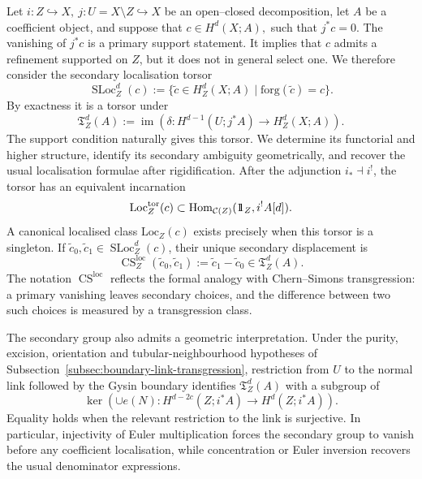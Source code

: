 \documentclass[10pt,a4paper,dvipsnames,x11names]{amsart}
\newcommand{\one}{1\hskip-3.5pt1}
\newcommand{\C}{\mathcal C}
\newcommand{\Hom}{\mathrm{Hom}}
\newcommand{\forg}{\mathrm{forg}}
\newcommand{\Loc}{\mathrm{Loc}}
\newcommand{\SLoc}{\operatorname{SLoc}}
\newcommand{\TLoc}{\mathfrak T}
\newcommand{\CSLoc}{\operatorname{CS}^{\mathrm{loc}}}
\numberwithin{equation}{section}
\theoremstyle{plain}
\theoremstyle{definition}
\theoremstyle{remark}
\begin{document}
Let
$
i:Z\hookrightarrow X,\  j:U=X\setminus Z\hookrightarrow X
$
be an open--closed decomposition, let $A$ be a coefficient object, and suppose that
$
c\in H^d(X;A),$ such that $ j^*c=0.
$
The vanishing of $j^*c$ is a primary support statement. It implies that $c$ admits a refinement supported on $Z$, but it does not in general select one. We therefore consider the secondary localisation torsor
\[
\SLoc_Z^d(c)
:=
\{\widetilde c\in H_Z^d(X;A)\mid \forg(\widetilde c)=c\}.
\]
By exactness it is a torsor under
\[
\TLoc_Z^d(A)
:=
\operatorname{im}\!\left(
\delta:H^{d-1}(U;j^*A)\longrightarrow H_Z^d(X;A)
\right).
\]
The support condition naturally gives this torsor. We determine its functorial and higher structure, identify its secondary ambiguity geometrically, and recover the usual localisation formulae after rigidification. 
After the adjunction $i_*\dashv i^!$, the torsor has an equivalent incarnation
\[
\Loc_Z^{\mathrm{tor}}(c)
\subset
\Hom_{\C(Z)}(\one_Z,i^!A[d]).
\]
A canonical localised class $\Loc_Z(c)$ exists precisely when this torsor is a singleton. If $\widetilde c_0,\widetilde c_1\in\SLoc_Z^d(c)$, their unique secondary displacement is
\[
\CSLoc_Z(\widetilde c_0,\widetilde c_1)
:=
\widetilde c_1-\widetilde c_0
\in
\TLoc_Z^d(A).
\]
The notation $\CSLoc$ reflects the formal analogy with Chern--Simons transgression: a primary vanishing leaves secondary choices, and the difference between two such choices is measured by a transgression class.

The secondary group also admits a geometric interpretation. Under the purity, excision, orientation and tubular-neighbourhood hypotheses of Subsection~\ref{subsec:boundary-link-transgression}, restriction from $U$ to the normal link followed by the Gysin boundary identifies $\TLoc_Z^d(A)$ with a subgroup of
\[
\ker\!\left(
\cup e(N):H^{d-2c}(Z;i^*A)\longrightarrow H^d(Z;i^*A)
\right).
\]
Equality holds when the relevant restriction to the link is surjective. In particular, injectivity of Euler multiplication forces the secondary group to vanish before any coefficient localisation, while concentration or Euler inversion recovers the usual denominator expressions.
\end{document}
